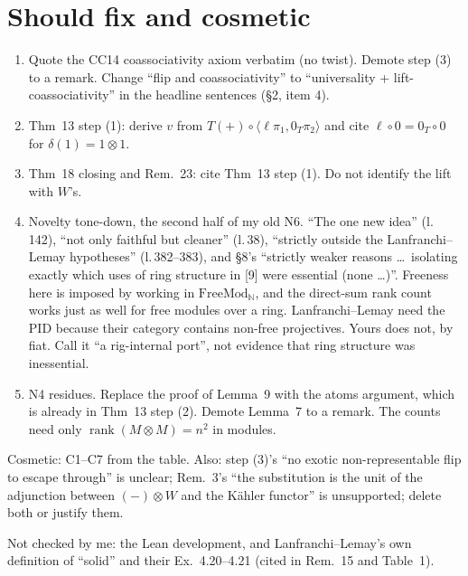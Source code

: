 \documentclass[11pt]{article}
\newcommand{\N}{\mathbb{N}}
\begin{document}
\section{Should fix and cosmetic}
\begin{enumerate}[label=\textbf{S\arabic*.},leftmargin=*]
\item Quote the CC14 coassociativity axiom verbatim (no twist). Demote step (3) to a remark.
Change ``flip and coassociativity'' to ``universality + lift-coassociativity'' in the headline
sentences (\S2, item 4).
\item Thm~13 step (1): derive $v$ from $T(+)\circ\langle\ell\pi_1,0_T\pi_2\rangle$ and cite
$\ell\circ0=0_T\circ0$ for $\delta(1)=1\otimes1$.
\item Thm~18 closing and Rem.~23: cite Thm~13 step (1). Do not identify the lift with $W$'s.
\item Novelty tone-down, the second half of my old N6. ``The one new idea'' (l.\,142), ``not only
faithful but cleaner'' (l.\,38), ``strictly outside the Lanfranchi--Lemay hypotheses''
(l.\,382--383), and \S8's ``strictly weaker reasons \dots\ isolating exactly which uses of ring
structure in [9] were essential (none \dots)''. Freeness here is imposed by working in
$\mathrm{FreeMod}_\N$, and the direct-sum rank count works just as well for free modules over a
ring. Lanfranchi--Lemay need the PID because their category contains non-free projectives. Yours
does not, by fiat. Call it ``a rig-internal port'', not evidence that ring structure was
inessential.
\item N4 residues. Replace the proof of Lemma~9 with the atoms argument, which is already in
Thm~13 step (2). Demote Lemma~7 to a remark. The counts need only
$\operatorname{rank}(M\otimes M)=n^2$ in modules.
\end{enumerate}
Cosmetic: C1--C7 from the table. Also: step (3)'s ``no exotic non-representable flip to escape
through'' is unclear; Rem.~3's ``the substitution is the unit of the adjunction between
$(-)\otimes W$ and the Kähler functor'' is unsupported; delete both or justify them.

Not checked by me: the Lean development, and Lanfranchi--Lemay's own definition of ``solid'' and
their Ex.~4.20--4.21 (cited in Rem.~15 and Table~1).
\end{document}
